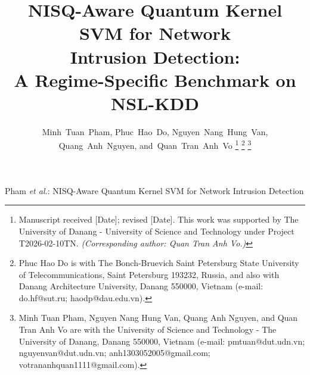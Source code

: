 \title{NISQ-Aware Quantum Kernel SVM for Network\\
  Intrusion Detection:\\
  A Regime-Specific Benchmark on NSL-KDD}

\author{Minh~Tuan~Pham,
        Phuc~Hao~Do,
        Nguyen~Nang~Hung~Van,
        Quang~Anh~Nguyen,
        and~Quan~Tran~Anh~Vo%
\thanks{Manuscript received [Date]; revised [Date]. This work was supported by
The University of Danang - University of Science and Technology under Project
T2026-02-10TN. \emph{(Corresponding author: Quan Tran Anh Vo.)}}
\thanks{Phuc Hao Do is with The Bonch-Bruevich Saint Petersburg State University
of Telecommunications, Saint Petersburg 193232, Russia, and also with Danang
Architecture University, Danang 550000, Vietnam (e-mail: do.hf@sut.ru;
haodp@dau.edu.vn).}
\thanks{Minh Tuan Pham, Nguyen Nang Hung Van, Quang Anh Nguyen, and Quan Tran
Anh Vo are with the University of Science and Technology - The University of
Danang, Danang 550000, Vietnam (e-mail: pmtuan@dut.udn.vn;
nguyenvan@dut.udn.vn; anh1303052005@gmail.com; votrananhquan1111@gmail.com).}}

%
{Pham \MakeLowercase{\textit{et al.}}: NISQ-Aware Quantum Kernel SVM for Network Intrusion Detection}

\maketitle


